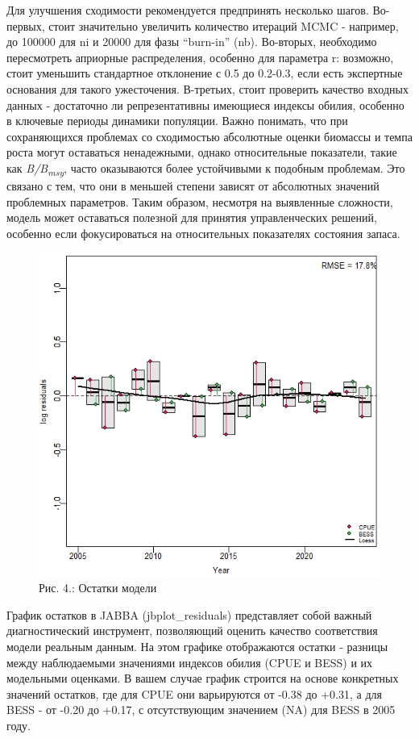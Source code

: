\documentclass[
  letterpaper,
  DIV=11,
  numbers=noendperiod]{scrreprt}
\begin{document}
Для улучшения сходимости рекомендуется предпринять несколько шагов.
Во-первых, стоит значительно увеличить количество итераций MCMC -
например, до 100000 для ni и 20000 для фазы ``burn-in'' (nb). Во-вторых,
необходимо пересмотреть априорные распределения, особенно для параметра
r: возможно, стоит уменьшить стандартное отклонение с 0.5 до 0.2-0.3,
если есть экспертные основания для такого ужесточения. В-третьих, стоит
проверить качество входных данных - достаточно ли репрезентативны
имеющиеся индексы обилия, особенно в ключевые периоды динамики
популяции. Важно понимать, что при сохраняющихся проблемах со
сходимостью абсолютные оценки биомассы и темпа роста могут оставаться
ненадежными, однако относительные показатели, такие как
\emph{B/B\textsubscript{msy}}, часто оказываются более устойчивыми к
подобным проблемам. Это связано с тем, что они в меньшей степени зависят
от абсолютных значений проблемных параметров. Таким образом, несмотря на
выявленные сложности, модель может оставаться полезной для принятия
управленческих решений, особенно если фокусироваться на относительных
показателях состояния запаса.

\begin{figure}[H]

{\centering \includegraphics[width=0.6\linewidth,height=\textheight,keepaspectratio]{images/JABBA4.png}

}

\caption{Рис. 4.: Остатки модели}

\end{figure}%

График остатков в JABBA (jbplot\_residuals) представляет собой важный
диагностический инструмент, позволяющий оценить качество соответствия
модели реальным данным. На этом графике отображаются остатки - разницы
между наблюдаемыми значениями индексов обилия (CPUE и BESS) и их
модельными оценками. В вашем случае график строится на основе конкретных
значений остатков, где для CPUE они варьируются от -0.38 до +0.31, а для
BESS - от -0.20 до +0.17, с отсутствующим значением (NA) для BESS в 2005
году.
\end{document}
